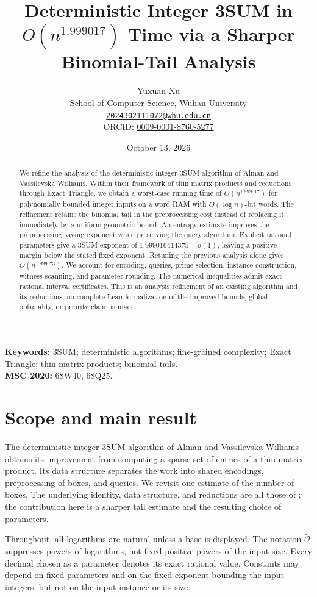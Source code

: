 \documentclass[11pt,a4paper]{article}
\title{Deterministic Integer 3SUM in\newline
\texorpdfstring{$O(n^{1.999017})$}{O(n\string^1.999017)} Time via a Sharper\newline
Binomial-Tail Analysis}
\author{Yuxuan Xu\\[3pt]
\small School of Computer Science, Wuhan University\\
\small \href{mailto:2024302111072@whu.edu.cn}{\texttt{2024302111072@whu.edu.cn}}\\
\small ORCID: \href{https://orcid.org/0009-0001-8760-5277}{0009-0001-8760-5277}}
\date{October 13, 2026}
\theoremstyle{remark}
\newcommand{\Ot}{\widetilde{\mathcal{O}}}
\begin{document}
\maketitle
\begin{abstract}
We refine the analysis of the deterministic integer 3SUM algorithm of Alman
and Vassilevska Williams. Within their framework of thin matrix products and
reductions through Exact Triangle, we obtain a worst-case running time of
$O(n^{1.999017})$ for polynomially bounded integer inputs on a word RAM with
$O(\log n)$-bit words. The refinement retains the binomial tail in the
preprocessing cost instead of replacing it immediately by a uniform geometric
bound. An entropy estimate improves the preprocessing saving exponent while
preserving the query algorithm. Explicit rational parameters give a 3SUM
exponent of $1.999016414375+o(1)$, leaving a positive margin below the stated
fixed exponent. Retuning the previous analysis alone gives $O(n^{1.999073})$.
We account for encoding, queries, prime selection, instance construction,
witness scanning, and parameter rounding. The numerical inequalities admit
exact rational interval certificates. This is an analysis refinement of an
existing algorithm and its reductions; no complete Lean formalization of the
improved bounds, global optimality, or priority claim is made.
\end{abstract}

\noindent\textbf{Keywords:} 3SUM; deterministic algorithms; fine-grained
complexity; Exact Triangle; thin matrix products; binomial tails.\\
\textbf{MSC 2020:} 68W40, 68Q25.

\section{Scope and main result}

The deterministic integer 3SUM algorithm of Alman and Vassilevska Williams
\cite{AVW} obtains its improvement from computing a sparse set of entries of
a thin matrix product. Its data structure separates the work into shared
encodings, preprocessing of boxes, and queries. We revisit one estimate of the
number of boxes. The underlying identity, data structure, and reductions are
all those of \cite{AVW}; the contribution here is a sharper tail estimate and
the resulting choice of parameters.

Throughout, all logarithms are natural unless a base is displayed. The notation
$\Ot$ suppresses powers of logarithms, not fixed positive powers of the input
size. Every decimal chosen as a parameter denotes its exact rational value.
Constants may depend on fixed parameters and on the fixed exponent bounding
the input integers, but not on the input instance or its size.
\end{document}
